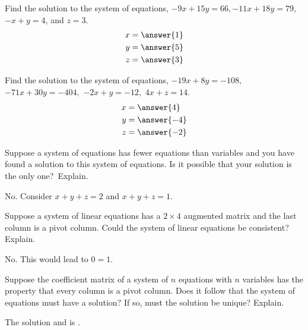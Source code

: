 \documentclass{ximera}
\begin{document}
\begin{problem}\label{prb:2.37} Find the solution to the system of equations,
$-9x+15y=66,-11x+18y=79$, $-x+y=4$, and $z=3$.
 \begin{align*}
 x&=\answer{1}\\
 y&=\answer{5}\\
 z&=\answer{3}\\
 \end{align*}
\end{problem}

\begin{problem}\label{prb:2.38} Find the solution to the system of equations, $-19x+8y=-108,$
$-71x+30y=-404,$ $-2x+y=-12,$ $4x+z=14.$
 \begin{align*}
 x&=\answer{4}\\
 y&=\answer{-4}\\
 z&=\answer{-2}\\
 \end{align*}
\end{problem}

\begin{problem}\label{prb:2.39} Suppose a system of equations has fewer equations than variables and
you have found a solution to this system of equations. Is it possible that
your solution is the only one?\ Explain.
\begin{hint}
No. Consider $x+y+z=2$ and $x+y+z=1.$
\end{hint}
\end{problem}

\begin{problem}\label{prb:2.40} Suppose a system of linear equations has a $2\times 4$ augmented
matrix and the last column is a pivot column. Could the system of linear
equations be consistent? Explain.
\begin{hint}
 No. This would lead to $0=1.$
\end{hint}
\end{problem}

\begin{problem}\label{prb:2.41} Suppose the coefficient matrix of a system of $n$ equations with $n$
variables has the property that every column is a pivot column. Does it
follow that the system of equations must have a solution? If so, must the
solution be unique? Explain.

The solution  and is .
\end{problem}
\end{document}
